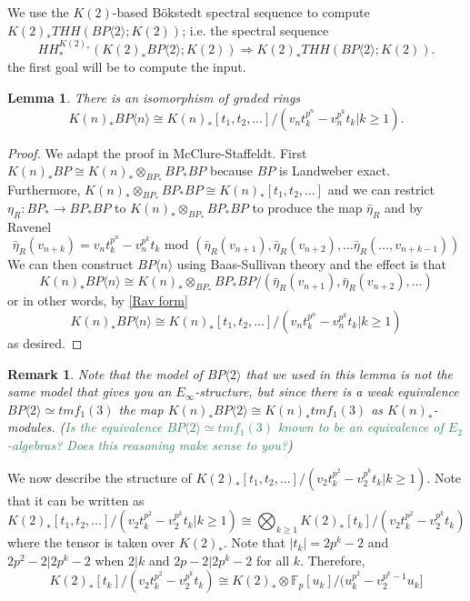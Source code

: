 \documentclass[12pt]{amsart}
\newcommand{\bra}[1]{\langle #1 \rangle}
\newcommand{\tBP}[1]{BP\bra{#1}}
\newtheorem{lem}[equation]{Lemma}
\newtheorem{rem}[equation]{Remark}
\theoremstyle{definition}
\numberwithin{equation}{section}
\numberwithin{figure}{section}
\begin{document}
We use the $K(2)$-based B\"okstedt spectral sequence to compute $K(2)_*THH(\tBP{2};K(2))$; i.e. the spectral sequence
\[ HH_*^{K(2)_*}(K(2)_*\tBP{2};K(2))\Rightarrow K(2)_*THH(\tBP{2};K(2)).\]
the first goal will be to compute the input. 
\begin{lem}There is an isomorphism of graded rings
\[K(n)_*\tBP{n}\cong K(n)_*[t_1,t_2, \dots]/(v_nt_k^{p^n}-v_n^{p^k}t_k | k\ge 1).\]
\end{lem}
\begin{proof}
We adapt the proof in McClure-Staffeldt. First $K(n)_*BP\cong K(n)_*\otimes_{BP_*}BP_*BP$ because $BP$ is Landweber exact. Furthermore, $K(n)_*\otimes_{BP_*}BP_*BP\cong K(n)_*[t_1,t_2,\dots]$ and we can restrict $\eta_R:BP_*\rightarrow BP_*BP$ to $K(n)_*\otimes_{BP_*}BP_*BP$ to produce the map $\bar{\eta}_R$ and by Ravenel 
\begin{equation}\label{Rav form} \bar{\eta}_R(v_{n+k})=v_nt_k^{p^n}-v_n^{p^k}t_k  \text{ mod } (\bar{\eta}_R(v_{n+1}),\bar{\eta}_R(v_{n+2}), \dots\bar{\eta}_R(\dots, v_{n+k-1}) )\end{equation}
We can then construct $\tBP{n}$ using Baas-Sullivan theory and the effect is that 
\[ K(n)_*\tBP{n}\cong K(n)_*\otimes_{BP_*}BP_*BP/(\bar{\eta}_R(v_{n+1}), \bar{\eta}_R(v_{n+2}), \dots )\]
or in other words, by \eqref{Rav form}
\[ K(n)_*\tBP{n} \cong K(n)_*[t_1,t_2, \dots]/(v_nt_k^{p^n}-v_n^{p^k}t_k | k\ge 1) \]
as desired. 
\end{proof}
\begin{rem}
Note that the model of $\tBP{2}$ that we used in this lemma is not the same model that gives you an $E_{\infty}$-structure, but since there is a weak equivalence $\tBP{2}\simeq tmf_1(3)$ the map $K(n)_*\tBP{2}\cong K(n)_*tmf_1(3)$ as $K(n)_*$-modules. (\textcolor{seagreen}{Is the equivalence $\tBP{2}\simeq tmf_1(3)$ known to be an equivalence of $E_2$-algebras? Does this reasoning make sense to you?})
\end{rem}
We now describe the structure of $K(2)_*[t_1,t_2, \dots]/(v_2t_k^{p^2}-v_2^{p^k}t_k | k\ge 1)$. Note that it can be written as 
\begin{equation}\label{K(2) computation} K(2)_*[t_1,t_2, \dots]/(v_2t_k^{p^2}-v_2^{p^k}t_k | k\ge 1) \cong \bigotimes_{k\ge 1} K(2)_*[t_k]/(v_2t_k^{p^2}-v_2^{p^k}t_k )\end{equation}
where the tensor is taken over $K(2)_*$. Note that $|t_k|=2p^k-2$ and $2p^2-2|2p^k-2$ when $2|k$ and $2p-2|2p^k-2$ for all $k$. Therefore, 
\[ K(2)_*[t_k]/(v_2t_k^{p^2}-v_2^{p^k}t_k )\cong K(2)_*\otimes \mathbb{F}_p[u_k]/(u_k^{p^2}-v_2^{p^k-1}u_k]\]
\end{document}
